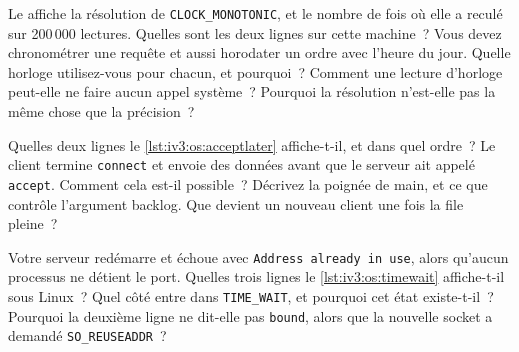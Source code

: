 \begin{question}\label{iq:iv3:operating-systems-concurrency-and-networks:19}
Le  affiche la résolution de \texttt{CLOCK\_MONOTONIC}, et le nombre de fois où elle a reculé sur 200\,000 lectures. Quelles sont les deux lignes sur cette machine~? Vous devez chronométrer une requête et aussi horodater un ordre avec l'heure du jour. Quelle horloge utilisez-vous pour chacun, et pourquoi~? Comment une lecture d'horloge peut-elle ne faire aucun appel système~? Pourquoi la résolution n'est-elle pas la même chose que la précision~?
\label{lst:iv3:os:clocks}
\end{question}

\begin{question}\label{iq:iv3:operating-systems-concurrency-and-networks:20}
Quelles deux lignes le \cref{lst:iv3:os:acceptlater} affiche-t-il, et dans quel ordre~? Le client termine \texttt{connect} et envoie des données avant que le serveur ait appelé \texttt{accept}. Comment cela est-il possible~? Décrivez la poignée de main, et ce que contrôle l'argument backlog. Que devient un nouveau client une fois la file pleine~?
\label{lst:iv3:os:acceptlater}
\end{question}

\begin{question}\label{iq:iv3:operating-systems-concurrency-and-networks:21}
Votre serveur redémarre et échoue avec \texttt{Address already in use}, alors qu'aucun processus ne détient le port. Quelles trois lignes le \cref{lst:iv3:os:timewait} affiche-t-il sous Linux~? Quel côté entre dans \texttt{TIME\_WAIT}, et pourquoi cet état existe-t-il~? Pourquoi la deuxième ligne ne dit-elle pas \texttt{bound}, alors que la nouvelle socket a demandé \texttt{SO\_REUSEADDR}~?
\label{lst:iv3:os:timewait}
\end{question}

